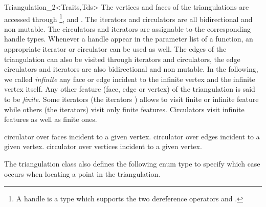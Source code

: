 \begin{ccClassTemplate}{Triangulation_2<Traits,Tds>}
\ccThreeToTwo
The vertices and faces of the triangulations are accessed through 
\footnote{ A handle is a type which supports the two
dereference operators  and .}, 
 and . 
The iterators and circulators
are all bidirectional and non mutable.
The circulators and iterators are assignable to the 
corresponding handle types. Whenever a handle appear in the parameter 
list of a function, an appropriate iterator or circulator can be used as well.
The edges of the triangulation can also be visited through iterators
and circulators,
the edge circulators and iterators
are also bidirectional and non mutable.
In the following, we called {\it infinite} any face or edge 
incident  to the infinite vertex and the infinite vertex itself.
 Any other feature (face, edge or vertex) of the triangulation is said 
to be {\it finite}.
Some iterators (the  iterators ) allows to visit finite or 
infinite feature while others (the  iterators) visit only
finite features. Circulators visit infinite features as well as finite 
ones.

\ccGlue
{}


\ccGlue
{}
\ccGlue
{}

\ccGlue
{}
\ccGlue
{}




{circulator over faces incident to a given vertex.}
\ccGlue
{}
{circulator over edges incident to a given vertex.}
\ccGlue
{}
{circulator over vertices incident to a given vertex.}

The triangulation class also defines the following enum type to specify
which case occurs when locating a point in the triangulation.



\end{ccClassTemplate}
